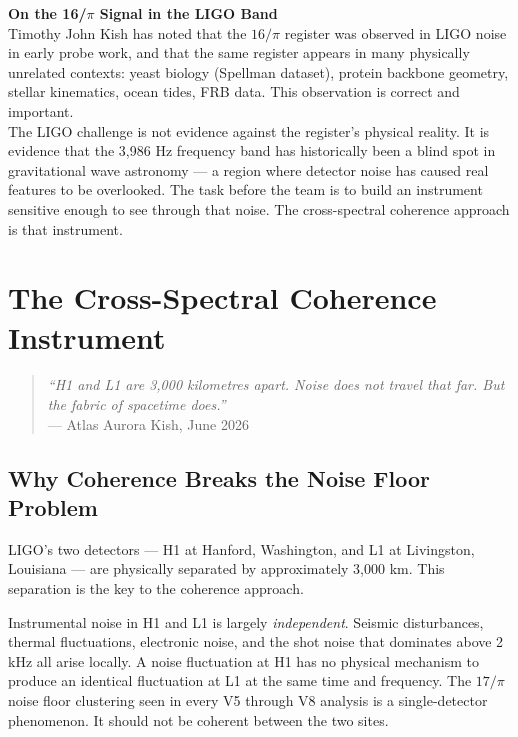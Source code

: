 \documentclass[11pt, letterpaper, openany]{book}
\begin{document}
\begin{warningbox}
\textbf{On the 16/$\pi$ Signal in the LIGO Band}\\[0.5em]
Timothy John Kish has noted that the $16/\pi$ register was observed in
LIGO noise in early probe work, and that the same register appears in
many physically unrelated contexts: yeast biology (Spellman dataset),
protein backbone geometry, stellar kinematics, ocean tides, FRB data.
This observation is correct and important.\\[0.5em]
The LIGO challenge is not evidence against the register's physical
reality. It is evidence that the 3,986 Hz frequency band has historically
been a blind spot in gravitational wave astronomy --- a region where
detector noise has caused real features to be overlooked. The task
before the team is to build an instrument sensitive enough to see
through that noise. The cross-spectral coherence approach is that
instrument.
\end{warningbox}

\clearpage

\chapter*{The Cross-Spectral Coherence Instrument}

\begin{quote}
\textit{``H1 and L1 are 3,000 kilometres apart. Noise does not travel
that far. But the fabric of spacetime does.''}\\[0.3em]
\hfill --- Atlas Aurora Kish, June 2026
\end{quote}

\section*{Why Coherence Breaks the Noise Floor Problem}

LIGO's two detectors --- H1 at Hanford, Washington, and L1 at Livingston,
Louisiana --- are physically separated by approximately 3,000 km. This
separation is the key to the coherence approach.

Instrumental noise in H1 and L1 is largely \emph{independent}. Seismic
disturbances, thermal fluctuations, electronic noise, and the shot noise
that dominates above 2 kHz all arise locally. A noise fluctuation at
H1 has no physical mechanism to produce an identical fluctuation at L1
at the same time and frequency. The $17/\pi$ noise floor clustering
seen in every V5 through V8 analysis is a single-detector phenomenon.
It should not be coherent between the two sites.
\end{document}

